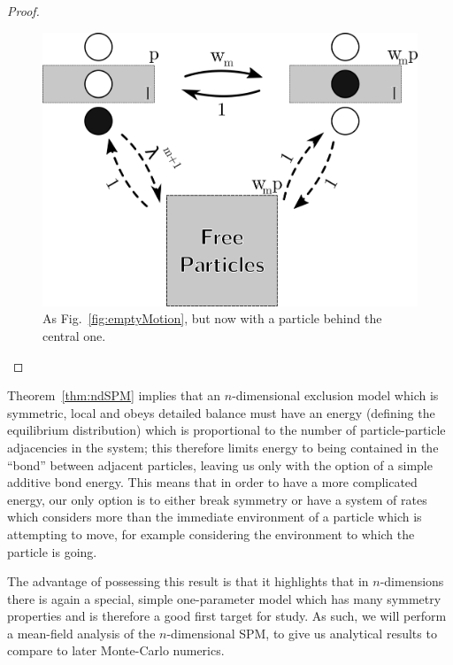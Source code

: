\begin{proof}
 \begin{figure}[h!]
 \caption[Figure demonstrating that particle motion out of a hyperplane with $m$ adjacent particles away from an empty space moves with rate $\lambda^m$.]{\label{fig:fullMotion} 
 As Fig.~\ref{fig:emptyMotion}, but now with a particle behind the central one. 
 }
  \begin{center}
 \includegraphics[width=0.66\linewidth]{analytics/images/ndDBwCycle}
  \end{center}
\end{figure}

\end{proof}

Theorem~\ref{thm:ndSPM} implies that an $n$-dimensional exclusion model which is symmetric, local and obeys detailed balance must have an energy (defining the equilibrium distribution)
which is proportional to the number of particle-particle adjacencies in the system; this
therefore limits energy to being contained in the ``bond'' between adjacent particles, leaving us only with the option of a simple additive bond energy. This means that in order to have a more complicated energy, our only option is to either break symmetry or have a
system of rates which considers more than the immediate environment of a particle which is
attempting to move, for example considering the environment to which the particle is going.

The advantage of possessing this result is that it highlights that in $n$-dimensions
there is again a special, simple one-parameter model which has many symmetry properties and
is therefore a good first target for study. As such, we will perform a mean-field analysis
of the $n$-dimensional SPM, to give us analytical results to compare to later Monte-Carlo numerics.

